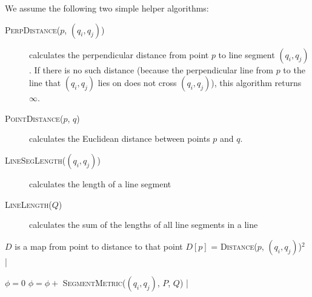 We assume the following two simple helper algorithms:

\begin{description}
	\item[\textsc{PerpDistance}($p$, $(q_i, q_j)$)] calculates the perpendicular distance from point $p$ to line segment $(q_i, q_j)$.
		If there is no such distance (because the perpendicular line from $p$ to the line that $(q_i, q_j)$ lies on does not cross $(q_i, q_j)$), this algorithm returns $\infty$.
	\item[\textsc{PointDistance}($p$, $q$)] calculates the Euclidean distance between points $p$ and $q$.
	\item[\textsc{LineSegLength}($(q_i, q_j)$)] calculates the length of a line segment
	\item[\textsc{LineLength}($Q$)] calculates the sum of the lengths of all line segments in a line
\end{description}

\begin{sourcecode}
\qend

$D$ is a map from point to distance to that point
	$D[p]$ = \textsc{Distance}($p$, $(q_i, q_j)$)$^2$
|
\qend

$\phi = 0$
	$\phi = \phi + $ \textsc{SegmentMetric}($(q_i, q_j)$, $P$, $Q$)
|
\return{\phi}
\qend
\end{sourcecode}
